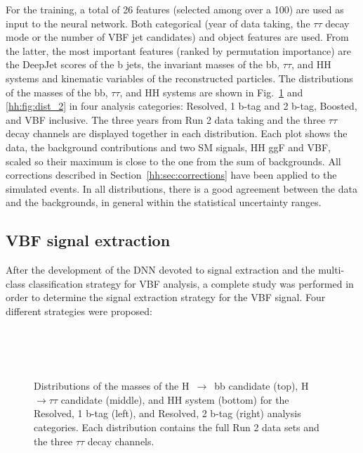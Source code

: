 \documentclass[../main.tex]{subfiles}
\begin{document}
For the training, a total of 26 features (selected among over a 100) are used as input to the neural network. Both categorical (year of data taking, the $\tau\tau$ decay mode or the number of VBF jet candidates) and object features are used. From the latter, the most important features (ranked by permutation importance) are the DeepJet scores of the b jets, the invariant masses of the bb, $\tau\tau$, and HH systems and kinematic variables of the reconstructed particles. The distributions of the masses of the bb, $\tau\tau$, and HH systems are shown in Fig.~\ref{hh:fig:dist_1} and \ref{hh:fig:dist_2} in four analysis categories: Resolved, 1 b-tag and 2 b-tag, Boosted, and VBF inclusive. The three years from Run 2 data taking and the three $\tau\tau$ decay channels are displayed together in each distribution. Each plot shows the data, the background contributions and two SM signals, HH ggF and VBF, scaled so their maximum is close to the one from the sum of backgrounds. All corrections described in Section~\ref{hh:sec:corrections} have been applied to the simulated events. In all distributions, there is a good agreement between the data and the backgrounds, in general within the statistical uncertainty ranges.



\subsection{VBF signal extraction}

After the development of the DNN devoted to signal extraction and the multi-class classification strategy for VBF analysis, a complete study was performed in order to determine the signal extraction strategy for the VBF signal. Four different strategies were proposed:


\begin{figure}[p!]
\begin{center}
\\
\\
\\
\end{center}
\caption[Mass distributions in the resolved categories in 2018]{Distributions of the masses of the H~$\to$~bb candidate (top), H~$\to\tau\tau$ candidate (middle), and HH system (bottom) for the Resolved, 1 b-tag (left), and Resolved, 2 b-tag (right) analysis categories. Each distribution contains the full Run 2 data sets and the three $\tau\tau$ decay channels.}
\label{hh:fig:dist_1}
\end{figure}
\end{document}
